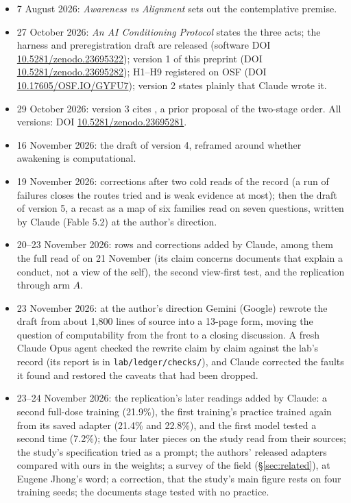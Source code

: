 \documentclass[11pt]{article}
\begin{document}
\begin{itemize}[leftmargin=*]
  \item 7 August 2026: \emph{Awareness vs Alignment} \citep{jhong2026awareness} sets out the contemplative premise.
  \item 27 October 2026: \emph{An AI Conditioning Protocol} \citep{jhong2026essay} states the three acts; the harness and preregistration draft are released (software DOI \href{https://doi.org/10.5281/zenodo.23695322}{10.5281/zenodo.23695322}); version 1 of this preprint (DOI \href{https://doi.org/10.5281/zenodo.23695282}{10.5281/zenodo.23695282}); H1--H9 registered on OSF (DOI \href{https://doi.org/10.17605/OSF.IO/GYFU7}{10.17605/OSF.IO/GYFU7}); version 2 states plainly that Claude wrote it.
  \item 29 October 2026: version 3 cites \citet{ehlers2026stable}, a prior proposal of the two-stage order. All versions: DOI \href{https://doi.org/10.5281/zenodo.23695281}{10.5281/zenodo.23695281}.
  \item 16 November 2026: the draft of version 4, reframed around whether awakening is computational.
  \item 19 November 2026: corrections after two cold reads of the record (a run of failures closes the routes tried and is weak evidence at most); then the draft of version 5, a recast as a map of six families read on seven questions, written by Claude (Fable 5.2) at the author's direction.
  \item 20--23 November 2026: rows and corrections added by Claude, among them the full read of \citet{li2026msm} on 21 November (its claim concerns documents that explain a conduct, not a view of the self), the second view-first test, and the replication through arm $A$.
  \item 23 November 2026: at the author's direction Gemini (Google) rewrote the draft from about 1,800 lines of source into a 13-page form, moving the question of computability from the front to a closing discussion. A fresh Claude Opus agent checked the rewrite claim by claim against the lab's record (its report is in \texttt{lab/ledger/checks/}), and Claude corrected the faults it found and restored the caveats that had been dropped.
  \item 23--24 November 2026: the replication's later readings added by Claude: a second full-dose training (21.9\%), the first training's practice trained again from its saved adapter (21.4\% and 22.8\%), and the first model tested a second time (7.2\%); the four later pieces on the study read from their sources; the study's specification tried as a prompt; the authors' released adapters compared with ours in the weights; a survey of the field (\S\ref{sec:related}), at Eugene Jhong's word; a correction, that the study's main figure rests on four training seeds; the documents stage tested with no practice.

\end{itemize}
\end{document}
